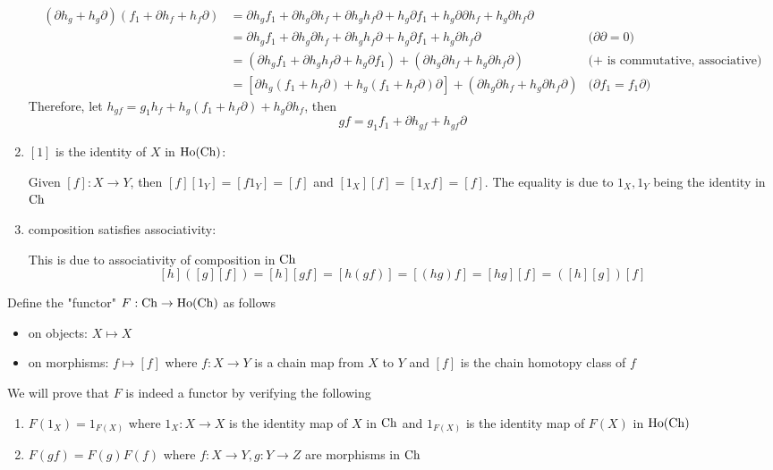 \documentclass{article}
\begin{document}
\begin{longproof}
\begin{enumerate}
    \begin{align*}
        (\partial h_g + h_g \partial)(f_1 + \partial h_f + h_f \partial)
        &= \partial h_g f_1 + \partial h_g \partial h_f + \partial h_g h_f \partial + h_g \partial f_1 + h_g \partial \partial h_f + h_g \partial h_f \partial \\
        &= \partial h_g f_1 + \partial h_g \partial h_f + \partial h_g h_f \partial + h_g \partial f_1 + h_g  \partial h_f \partial &\text{($\partial \partial = 0$)} \\
        &= (\partial h_g f_1 + \partial h_g h_f \partial + h_g \partial f_1) + (\partial h_g \partial h_f + h_g \partial h_f \partial) &\text{($+$ is commutative, associative)} \\
        &= [\partial h_g (f_1 + h_f \partial) + h_g (f_1 + h_f \partial) \partial] + (\partial h_g \partial h_f + h_g \partial h_f \partial) &\text{($\partial f_1 = f_1 \partial$)}
    \end{align*}
    Therefore, let $h_{gf} = g_1 h_f + h_g (f_1 + h_f \partial) + h_g \partial h_f$, then
    $$
        gf = g_1 f_1 + \partial h_{gf} + h_{gf} \partial
    $$
    
    \item $[1]$ is the identity of $X$ in $\operatorname{Ho}(\operatorname{Ch})$:

    Given $[f]: X \to Y$, then $[f][1_Y] = [f 1_Y] = [f]$ and $[1_X][f] = [1_X f] = [f]$. The equality is due to $1_X, 1_Y$ being the identity in $\operatorname{Ch}$
    
    \item composition satisfies associativity:

    This is due to associativity of composition in $\operatorname{Ch}$
    $$
        [h]([g][f]) = [h][gf] = [h(gf)] = [(hg)f] = [hg][f] = ([h][g])[f]
    $$

\end{enumerate}
\end{longproof}

Define the "functor" $F: \operatorname{Ch} \to \operatorname{Ho}(\operatorname{Ch})$ as follows
\begin{itemize}
    \item on objects: $X \mapsto X$
    \item on morphisms: $f \mapsto [f]$ where $f: X \to Y$ is a chain map from $X$ to $Y$ and $[f]$ is the chain homotopy class of $f$
\end{itemize}

We will prove that $F$ is indeed a functor by verifying the following
\begin{enumerate}
    \item $F(1_X) = 1_{F(X)}$ where $1_X: X \to X$ is the identity map of $X$ in $\operatorname{Ch}$ and $1_{F(X)}$ is the identity map of $F(X)$ in $\operatorname{Ho}(\operatorname{Ch})$
    \item $F(gf) = F(g)F(f)$ where $f: X \to Y, g: Y \to Z$ are morphisms in $\operatorname{Ch}$
\end{enumerate}
\end{document}
